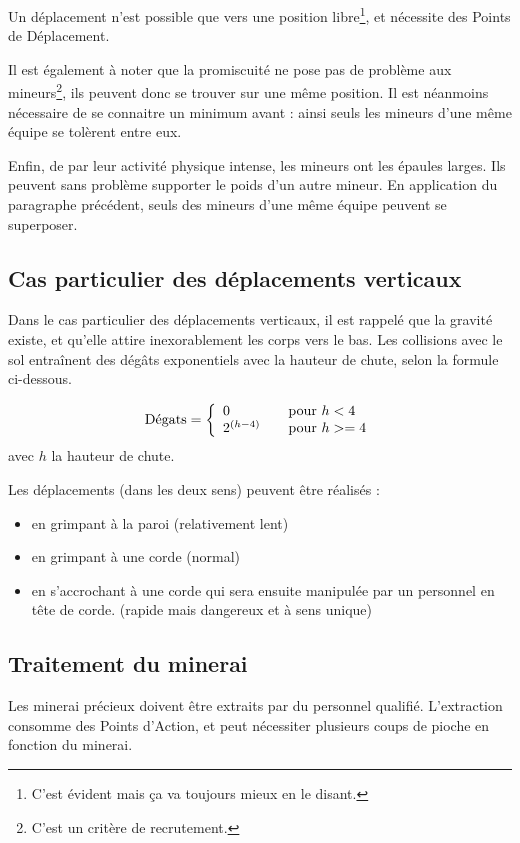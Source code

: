 Un déplacement n'est possible que vers une position libre\footnote{C'est évident mais ça va toujours mieux en le disant.}, et nécessite des Points de Déplacement.

Il est également à noter que la promiscuité ne pose pas de problème aux mineurs\footnote{C'est un critère de recrutement.}, ils peuvent donc se trouver sur une même position. Il est néanmoins nécessaire de se connaitre un minimum avant : ainsi seuls les mineurs d'une même équipe se tolèrent entre eux.

Enfin, de par leur activité physique intense, les mineurs ont les épaules larges. Ils peuvent sans problème supporter le poids d'un autre mineur. En application du paragraphe précédent, seuls des mineurs d'une même équipe peuvent se superposer.

\subsection{Cas particulier des déplacements verticaux}
Dans le cas particulier des déplacements verticaux, il est rappelé que la gravité existe, et qu'elle attire inexorablement les corps vers le bas. Les collisions avec le sol entraînent des dégâts exponentiels avec la hauteur de chute, selon la formule ci-dessous.

\[
\text{Dégats} = 
\left\{
        \begin{array}{l l}
        0 & \quad \text{pour $h < 4$}\\
        2^{(h-4)} & \quad \text{pour $h >= 4$}\\
        \end{array}
\right. \]
avec $h$ la hauteur de chute.

Les déplacements (dans les deux sens) peuvent être réalisés :
\begin{itemize}
        \item en grimpant à la paroi (relativement lent)
        \item en grimpant à une corde (normal)
        \item en s'accrochant à une corde qui sera ensuite manipulée par un personnel en tête de corde. (rapide mais dangereux et à sens unique)
\end{itemize}

\subsection{Traitement du minerai}
Les minerai précieux doivent être extraits par du personnel qualifié. L'extraction consomme des Points d'Action, et peut nécessiter plusieurs coups de pioche en fonction du minerai.

